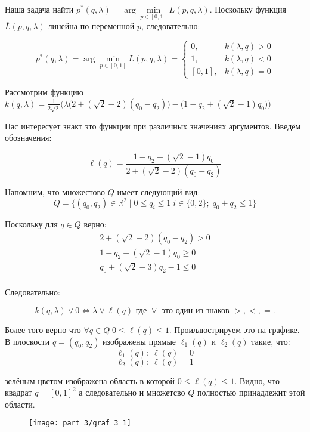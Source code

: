 \begin{flushleft}
	Наша задача найти 
	$p^*(q, \lambda)=\arg \min \limits_{p \in [0, 1]} \overline{L}(p,q,\lambda)$.
	Поскольку функция $\overline{L}(p,q,\lambda)$ линейна по переменной 
	$p$, следовательно:
	
	$$
		p^*(q, \lambda)=
		\arg \min \limits_{p \in [0, 1]} \overline{L}(p,q,\lambda)=
		\begin{cases}
			0, & k(\lambda,q)>0 \\
			1, & k(\lambda,q)<0 \\
			[0,1], & k(\lambda,q)=0
		\end{cases}	
	$$
	
	Рассмотрим функцию $k(q, \lambda)=\frac{1}{2\sqrt{2}}
	\Big(
		\lambda \big (2+(\sqrt{2}-2)(q_0-q_2) \big) -
		\big (1 - q_2 + (\sqrt{2} - 1)q_0 \big)
	\Big)
	$

	Нас интересует знакт это функции при различных значениях аргументов.
	Введём обозначения:
	
	$$\ell(q) = \frac{1 - q_2 + (\sqrt{2} - 1)q_0}{2+(\sqrt{2}-2)(q_0-q_2)}$$	
	
	Напомним, что множестово $Q$ имеет следующий вид:
	$$
		Q=\{(q_0,q_2) \in \mathbb{R}^2 \; | \;
		0 \leqslant q_i \leqslant 1 \; i\in\{0,2\}; \; 
		q_0 + q_2 \leqslant 1\}	
	$$	
	
	Поскольку для $q \in Q$ верно: 
	\begin{gather*}
	2+(\sqrt{2}-2)(q_0-q_2) > 0 \\
	1 - q_2 + (\sqrt{2} - 1)q_0 \geqslant 0 \\
	q_0 + (\sqrt{2} - 3) q_2 - 1 \leqslant 0 \\
	\end{gather*}
	
	Следовательно:
	
	$$
	k(q, \lambda) \vee 0 \Leftrightarrow 
	\lambda \vee \ell(q) \textrm{ где } \vee \textrm{ это один из знаков } >,<,=.
	$$
	
	Более того верно что 
	$\forall q \in Q \; 0 \leqslant \ell(q) \leqslant 1$. 
	Проиллюстрируем это на графике. В плоскости $q=(q_0,q_2)$ изображены 
	прямые $\ell_1(q)$ и $\ell_2(q)$ такие, что:
	$$\ell_1(q): \; \ell(q)=0 $$
	$$\ell_2(q): \; \ell(q)=1 $$
		
	зелёным цветом изображена область в которой
	$0 \leqslant \ell(q) \leqslant 1$.
	Видно, что квадрат $q = [0,1]^2$ а следовательно и
	множетсво $Q$ полностью принадлежит этой области.

	\begin{figure}[H]
		\centering
  		\texttt{[image: part\_3/graf\_3\_1]}
  		\caption{}
	\end{figure}
	

\end{flushleft}
